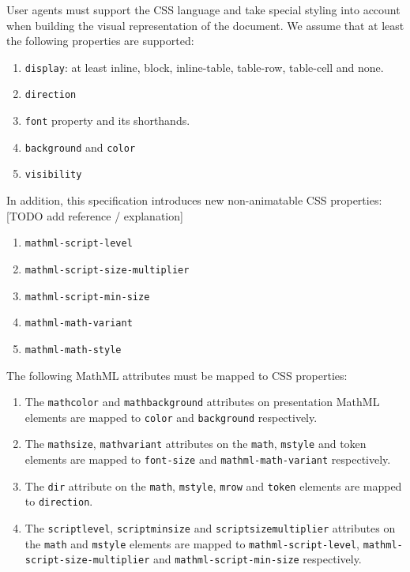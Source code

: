 User agents must support the CSS language \cite{CSS2} and take special styling
into account when building the visual representation of the document.
We assume that at least the following properties are supported:
%
\begin{enumerate}
\item {\tt display}: at least inline, block, inline-table, table-row,
  table-cell and none.
\item {\tt direction}
\item {\tt font} property and its shorthands.
\item {\tt background} and {\tt color}
\item {\tt visibility}
\end{enumerate}
%
In addition, this specification introduces new non-animatable CSS properties:
[TODO add reference / explanation]
%
\begin{enumerate}
\item {\tt mathml-script-level}
\item {\tt mathml-script-size-multiplier}
\item {\tt mathml-script-min-size}
\item {\tt mathml-math-variant}
\item {\tt mathml-math-style}
\end{enumerate}

The following MathML attributes must be mapped to CSS properties:
%
\begin{enumerate}
\item The {\tt mathcolor} and {\tt mathbackground} attributes on presentation
  MathML elements are mapped to {\tt color} and {\tt background} respectively.
\item The {\tt mathsize}, {\tt mathvariant} attributes on the {\tt math},
  {\tt mstyle} and token elements are mapped to {\tt font-size} and
  {\tt mathml-math-variant} respectively.
\item The {\tt dir} attribute on the {\tt math}, {\tt mstyle}, {\tt mrow} and
  {\tt token} elements are mapped to {\tt direction}.
\item The {\tt scriptlevel}, {\tt scriptminsize} and {\tt scriptsizemultiplier}
  attributes on the {\tt math} and {\tt mstyle} elements are mapped to
  {\tt mathml-script-level}, {\tt mathml-script-size-multiplier}
  and {\tt mathml-script-min-size} respectively.
\end{enumerate}

